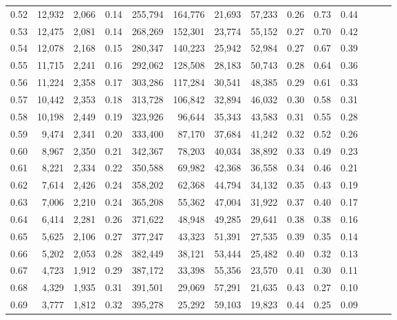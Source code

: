 \begin{tabular}{rrrrrrrrrrrrrr}
0.52 &  12,932 &  2,066 &  0.14 &  255,794 &  164,776 &  21,693 &  57,233 &  0.26 &  0.73 &      0.44 \\
0.53 &  12,475 &  2,081 &  0.14 &  268,269 &  152,301 &  23,774 &  55,152 &  0.27 &  0.70 &      0.42 \\
0.54 &  12,078 &  2,168 &  0.15 &  280,347 &  140,223 &  25,942 &  52,984 &  0.27 &  0.67 &      0.39 \\
0.55 &  11,715 &  2,241 &  0.16 &  292,062 &  128,508 &  28,183 &  50,743 &  0.28 &  0.64 &      0.36 \\
0.56 &  11,224 &  2,358 &  0.17 &  303,286 &  117,284 &  30,541 &  48,385 &  0.29 &  0.61 &      0.33 \\
0.57 &  10,442 &  2,353 &  0.18 &  313,728 &  106,842 &  32,894 &  46,032 &  0.30 &  0.58 &      0.31 \\
0.58 &  10,198 &  2,449 &  0.19 &  323,926 &   96,644 &  35,343 &  43,583 &  0.31 &  0.55 &      0.28 \\
0.59 &   9,474 &  2,341 &  0.20 &  333,400 &   87,170 &  37,684 &  41,242 &  0.32 &  0.52 &      0.26 \\
0.60 &   8,967 &  2,350 &  0.21 &  342,367 &   78,203 &  40,034 &  38,892 &  0.33 &  0.49 &      0.23 \\
0.61 &   8,221 &  2,334 &  0.22 &  350,588 &   69,982 &  42,368 &  36,558 &  0.34 &  0.46 &      0.21 \\
0.62 &   7,614 &  2,426 &  0.24 &  358,202 &   62,368 &  44,794 &  34,132 &  0.35 &  0.43 &      0.19 \\
0.63 &   7,006 &  2,210 &  0.24 &  365,208 &   55,362 &  47,004 &  31,922 &  0.37 &  0.40 &      0.17 \\
0.64 &   6,414 &  2,281 &  0.26 &  371,622 &   48,948 &  49,285 &  29,641 &  0.38 &  0.38 &      0.16 \\
0.65 &   5,625 &  2,106 &  0.27 &  377,247 &   43,323 &  51,391 &  27,535 &  0.39 &  0.35 &      0.14 \\
0.66 &   5,202 &  2,053 &  0.28 &  382,449 &   38,121 &  53,444 &  25,482 &  0.40 &  0.32 &      0.13 \\
0.67 &   4,723 &  1,912 &  0.29 &  387,172 &   33,398 &  55,356 &  23,570 &  0.41 &  0.30 &      0.11 \\
0.68 &   4,329 &  1,935 &  0.31 &  391,501 &   29,069 &  57,291 &  21,635 &  0.43 &  0.27 &      0.10 \\
0.69 &   3,777 &  1,812 &  0.32 &  395,278 &   25,292 &  59,103 &  19,823 &  0.44 &  0.25 &      0.09 \\

\end{tabular}
